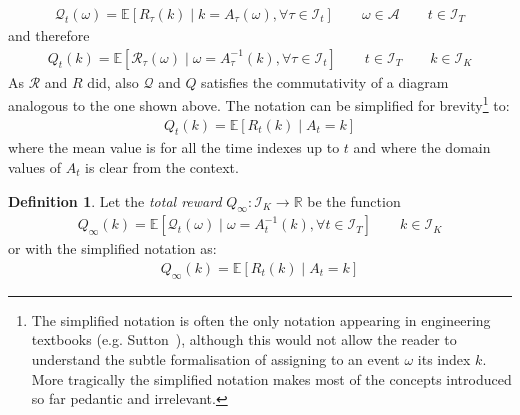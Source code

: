 \documentclass[]{scrartcl}
\theoremstyle{definition}
\newtheorem{definition}{Definition}[section]
\begin{document}
\begin{align}\label{def:mathcalQt}
\mathcal{Q}_t(\omega) = \mathbb{E} \left[ R_{\tau}(k)\mid k = A_{\tau}(\omega), \forall \tau \in \mathcal{I}_t \right]
\qquad
\omega \in \mathcal{A}
\qquad
t \in \mathcal{I}_T
\end{align}
and therefore
\begin{align}\label{def:Qt}
Q_t(k) = \mathbb{E} \left[ \mathcal{R}_{\tau}(\omega)\mid \omega = A_{\tau}^{-1}(k), \forall \tau \in \mathcal{I}_t \right]
\qquad
t \in \mathcal{I}_T
\qquad
k \in \mathcal{I}_K
\end{align}
As $\mathcal{R}$ and $R$ did, also $\mathcal{Q}$ and $Q$ satisfies the commutativity of a diagram analogous to the one shown above. The notation can be simplified for brevity\footnote{
    The simplified notation is often the only notation appearing in engineering textbooks (e.g. Sutton~\cite{sutton2018reinforcement}), although this would not allow the reader to understand the subtle formalisation of assigning to an event $\omega$ its index $k$. More tragically the simplified notation makes most of the concepts introduced so far pedantic and irrelevant.
} to:
\begin{align}\label{def:mathcalQt_simple}
Q_t(k) = \mathbb{E} \left[ R_{t}(k) \mid A_{t} = k \right]
\end{align}
where the mean value is for all the time indexes up to $t$ and where the domain values of $A_t$ is clear from the context.

\begin{definition}
    Let the \emph{total reward} $Q_{\infty}: \mathcal{I}_K \rightarrow \mathbb{R}$ be the function
    \begin{align}\label{def:mathcalQinf}
    Q_{\infty}(k) = \mathbb{E} \left[ \mathcal{Q}_{t}(\omega) \mid \omega = A^{-1}_{t}(k), \forall t \in \mathcal{I}_T \right]
    \qquad
    k \in \mathcal{I}_K
    \end{align}
    or with the simplified notation as:
    \begin{align}\label{def:mathcalQinf_simple}
    Q_{\infty}(k) = \mathbb{E} \left[ R_{t}(k) \mid A_{t} = k \right]
    \end{align}
\end{definition}
\end{document}
